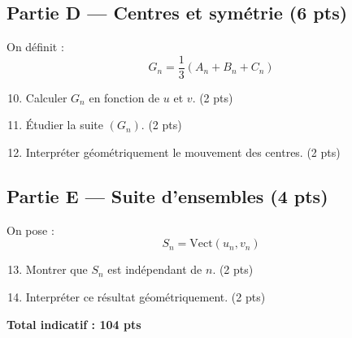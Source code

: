 \documentclass[11pt,a4paper]{article}
\begin{document}
\subsection*{Partie D — Centres et symétrie (6 pts)}

On définit :
\[
G_n = \frac{1}{3}(A_n + B_n + C_n)
\]

\begin{enumerate}
\setcounter{enumi}{9}
\item Calculer $G_n$ en fonction de $u$ et $v$. \hfill (2 pts)
\item Étudier la suite $(G_n)$. \hfill (2 pts)
\item Interpréter géométriquement le mouvement des centres. \hfill (2 pts)
\end{enumerate}

\subsection*{Partie E — Suite d’ensembles  (4 pts)}

On pose :
\[
S_n = \mathrm{Vect}(u_n,v_n)
\]

\begin{enumerate}
\setcounter{enumi}{12}
\item Montrer que $S_n$ est indépendant de $n$. \hfill (2 pts)
\item Interpréter ce résultat géométriquement. \hfill (2 pts)
\end{enumerate}

\bigskip

\textbf{Total indicatif : 104 pts}
\end{document}
